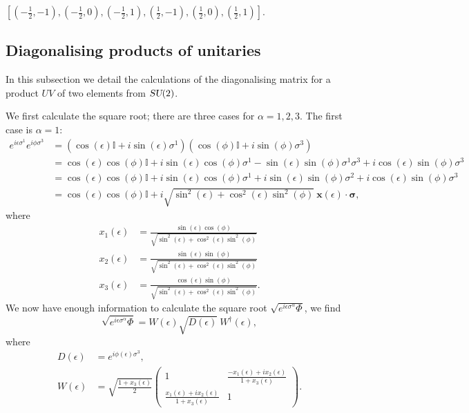 \documentclass[12pt]{amsart}
\def\su2{\textsl{SU}(2)}
\theoremstyle{definition}
\theoremstyle{remark}
\numberwithin{equation}{section}
\begin{document}
$[(-\tfrac12, -1), (-\tfrac12, 0), (-\tfrac12, 1), (\tfrac12, -1), (\tfrac12, 0), (\tfrac12, 1)]$.



\subsection{Diagonalising products of unitaries}\label{app:diagprod}
In this subsection we detail the calculations of the diagonalising matrix for a product $UV$ of two elements from $\su2$.

We first calculate the square root; there are three cases for $\alpha = 1,2, 3$. The first case is $\alpha = 1$:
\begin{equation}
	\begin{split}
		e^{i\epsilon \sigma^1}e^{i\phi \sigma^3} &= (\cos(\epsilon)\mathbb{I} + i\sin(\epsilon)\sigma^1)(\cos(\phi)\mathbb{I} + i\sin(\phi)\sigma^3) \\ 
		&= \cos(\epsilon)\cos(\phi)\mathbb{I} + i\sin(\epsilon)\cos(\phi)\sigma^1 - \sin(\epsilon)\sin(\phi)\sigma^1\sigma^3 + i\cos(\epsilon)\sin(\phi)\sigma^3 \\
		&= \cos(\epsilon)\cos(\phi)\mathbb{I} + i\sin(\epsilon)\cos(\phi)\sigma^1 + i\sin(\epsilon)\sin(\phi)\sigma^2 + i\cos(\epsilon)\sin(\phi)\sigma^3 \\
		&= \cos(\epsilon)\cos(\phi)\mathbb{I} + i\sqrt{\sin^2(\epsilon) + \cos^2(\epsilon)\sin^2(\phi)} \ \mathbf{x}(\epsilon)\cdot \boldsymbol{\sigma},
	\end{split}
\end{equation}
where
\begin{equation}
	\begin{split}
		x_1(\epsilon) &= \frac{\sin(\epsilon)\cos(\phi)}{\sqrt{\sin^2(\epsilon) + \cos^2(\epsilon)\sin^2(\phi)}}\\
		x_2(\epsilon) &= \frac{\sin(\epsilon)\sin(\phi)}{\sqrt{\sin^2(\epsilon) + \cos^2(\epsilon)\sin^2(\phi)}}\\
		x_3(\epsilon) &= \frac{\cos(\epsilon)\sin(\phi)}{\sqrt{\sin^2(\epsilon) + \cos^2(\epsilon)\sin^2(\phi)}}.
	\end{split}
\end{equation}
We now have enough information to calculate the square root $\sqrt{ e^{i\epsilon \sigma^\alpha}\Phi}$, we find
\begin{equation}
	\sqrt{ e^{i\epsilon \sigma^\alpha}\Phi} = W (\epsilon) \sqrt{D(\epsilon)}\ W^\dag(\epsilon),
\end{equation}
where
\begin{equation}
	\begin{split}
		D(\epsilon) &= e^{i\phi(\epsilon) \sigma^3}, \\
		W(\epsilon) &= \sqrt{\frac{1+x_3(\epsilon)}{2}}\begin{pmatrix} 1 & \frac{-x_1(\epsilon)+ix_2(\epsilon)}{1+x_3(\epsilon)}\\ \frac{x_1(\epsilon)+ix_2(\epsilon)}{1+x_3(\epsilon)} & 1\end{pmatrix}.
	\end{split}
\end{equation}
\end{document}
